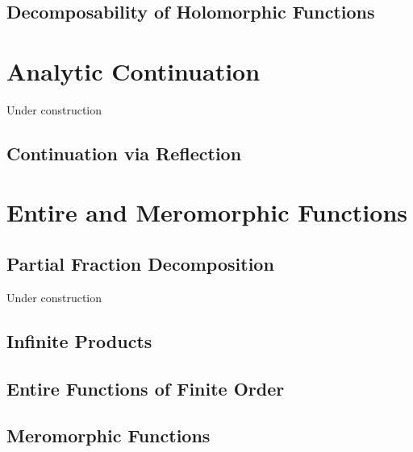 \documentclass[oneside]{memoir}
\begin{document}
\section{Decomposability of Holomorphic Functions}
\label{sec:decomposability_of_holomorphic_functions}




\chapter{Analytic Continuation} %
\label{cha:analytic_continuation}
%

Under construction

\section{Continuation via Reflection}
\label{sec:continuation_via_reflection}



\chapter{Entire and Meromorphic Functions}
\label{cha:entire_and_meromorphic_functions}

\section{Partial Fraction Decomposition}
\label{sec:partial_fraction_decomposition}

%
Under construction

\section{Infinite Products}
\label{sec:infinite_products}




\section{Entire Functions of Finite Order}
\label{sub:entire_functions_of_finite_order}



\section{Meromorphic Functions}
\label{sec:meromorphic_functions}
\end{document}
